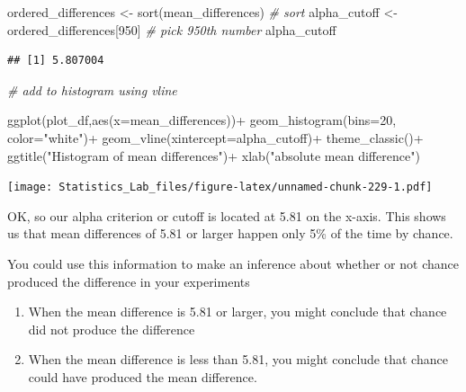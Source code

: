 \documentclass[
]{book}
\newenvironment{Shaded}{\begin{snugshade}}{\end{snugshade}}
\newcommand{\AttributeTok}[1]{\textcolor[rgb]{0.77,0.63,0.00}{#1}}
\newcommand{\CommentTok}[1]{\textcolor[rgb]{0.56,0.35,0.01}{\textit{#1}}}
\newcommand{\DecValTok}[1]{\textcolor[rgb]{0.00,0.00,0.81}{#1}}
\newcommand{\FunctionTok}[1]{\textcolor[rgb]{0.00,0.00,0.00}{#1}}
\newcommand{\NormalTok}[1]{#1}
\newcommand{\OtherTok}[1]{\textcolor[rgb]{0.56,0.35,0.01}{#1}}
\newcommand{\SpecialCharTok}[1]{\textcolor[rgb]{0.00,0.00,0.00}{#1}}
\newcommand{\StringTok}[1]{\textcolor[rgb]{0.31,0.60,0.02}{#1}}
\begin{document}
\begin{Shaded}
\begin{Highlighting}[]
\NormalTok{ordered\_differences }\OtherTok{\textless{}{-}} \FunctionTok{sort}\NormalTok{(mean\_differences) }\CommentTok{\# sort}
\NormalTok{alpha\_cutoff }\OtherTok{\textless{}{-}}\NormalTok{ ordered\_differences[}\DecValTok{950}\NormalTok{] }\CommentTok{\# pick 950th number}
\NormalTok{alpha\_cutoff}
\end{Highlighting}
\end{Shaded}

\begin{verbatim}
## [1] 5.807004
\end{verbatim}

\begin{Shaded}
\begin{Highlighting}[]
\CommentTok{\# add to histogram using vline}

\FunctionTok{ggplot}\NormalTok{(plot\_df,}\FunctionTok{aes}\NormalTok{(}\AttributeTok{x=}\NormalTok{mean\_differences))}\SpecialCharTok{+}
  \FunctionTok{geom\_histogram}\NormalTok{(}\AttributeTok{bins=}\DecValTok{20}\NormalTok{, }\AttributeTok{color=}\StringTok{"white"}\NormalTok{)}\SpecialCharTok{+}
  \FunctionTok{geom\_vline}\NormalTok{(}\AttributeTok{xintercept=}\NormalTok{alpha\_cutoff)}\SpecialCharTok{+}
  \FunctionTok{theme\_classic}\NormalTok{()}\SpecialCharTok{+}
  \FunctionTok{ggtitle}\NormalTok{(}\StringTok{"Histogram of mean differences"}\NormalTok{)}\SpecialCharTok{+}
  \FunctionTok{xlab}\NormalTok{(}\StringTok{"absolute mean difference"}\NormalTok{)}
\end{Highlighting}
\end{Shaded}

\texttt{[image: Statistics\_Lab\_files/figure-latex/unnamed-chunk-229-1.pdf]}

OK, so our alpha criterion or cutoff is located at 5.81 on the x-axis. This shows us that mean differences of 5.81 or larger happen only 5\% of the time by chance.

You could use this information to make an inference about whether or not chance produced the difference in your experiments

\begin{enumerate}
\def\labelenumi{\arabic{enumi}.}
\item
  When the mean difference is 5.81 or larger, you might conclude that chance did not produce the difference
\item
  When the mean difference is less than 5.81, you might conclude that chance could have produced the mean difference.
\end{enumerate}
\end{document}
